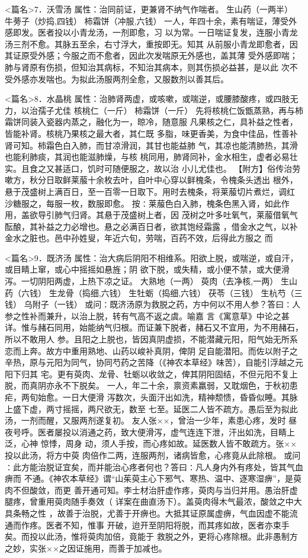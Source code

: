 \documentclass[a4paper,12pt,UTF8,twoside]{ctexbook}
\begin{document}
<篇名>7．沃雪汤
属性：治同前证，更兼肾不纳气作喘者。 
生山药（一两半） 牛蒡子（炒捣,四钱） 柿霜饼（冲服,六钱） 
一人，年四十余，素有喘证，薄受外感即发。医者投以小青龙汤，一剂即愈，习 
以为常。一日喘证复发，连服小青龙汤三剂不愈。其脉五至余，右寸浮大，重按即无。知其 
从前服小青龙即愈者，因其证原受外感；今服之而不愈者，因此次发喘原无外感也，盖其薄 
受外感即喘；肺与肾原有伤损，但知治其病标，不知治其病本，则其伤损必益甚，是以此 
次不受外感亦发喘也。为拟此汤服两剂全愈，又服数剂以善其后。 

<篇名>8．水晶桃
属性：治肺肾两虚，或咳嗽，或喘逆，或腰膝酸疼，或四肢无力，以治孺子尤佳 
核桃仁（一斤） 柿霜饼（一斤） 
先将核桃仁饭甑蒸熟，再与柿霜饼同装入瓷器内蒸之，融化为一，晾冷，随意服 
凡果核之仁，具补益之性者，皆能补肾。核桃乃果核之最大者，其仁既 
多脂，味更香美，为食中佳品，性善补肾可知。柿霜色白入肺，而甘凉滑润，其甘也能益肺 
气，其凉也能清肺热，其滑也能利肺痰，其润也能滋肺燥，与核 
桃同用，肺肾同补，金水相生，虚者必易壮实。且食之又甚适口，饥时可随便服之，故以治 
小儿尤佳也。 
【附方】俗传治劳嗽方，秋分日取鲜莱菔十余枚去叶，自叶中心穿以鲜槐条，令槐条头透出 
根外，悬于茂盛树上满百日，至一百零一日取下。用时去槐条，将莱菔切片煮烂，调红 
沙糖服之，每服一枚，数服即愈。 
按∶莱菔色白入肺，槐条色黑入肾，如此作用，盖欲导引肺气归肾。其悬于茂盛树上者，因 
茂树之叶多吐氧气，莱菔借氧气酝酿，其补益之力必增也。悬之必满百日者，欲其饱经霜露 
，借金水之气，以补金水之脏也。邑中孙姓叟，年近六旬，劳喘，百药不效，后得此方服之 
而 

<篇名>9．既济汤
属性：治大病后阴阳不相维系。阳欲上脱，或喘逆，或自汗，或目睛上窜，或心中摇摇如悬旌；阴 
欲下脱，或失精，或小便不禁，或大便滑泻。一切阴阳两虚，上热下凉之证。 
大熟地（一两） 萸肉（去净核,一两） 生山药（六钱） 生龙骨（捣细,六钱） 
生牡蛎（捣细,六钱） 茯苓（三钱） 生杭芍（三钱） 乌附子（一钱） 
或问∶既济汤原为救脱之药，方中何以不用人参？答曰∶人参之性补而兼升，以治上脱，转有气高不返之虞。喻嘉 
言《寓意草》中论之甚详。惟与赭石同用，始能纳气归根。而证兼下脱者，赭石又不宜用，为不用赭石，所以不敢用人 
参。且阳之上脱也，皆因真阴虚损，不能潜藏元阳，阳气始无所系恋而上奔。故方中重用熟地、山药以峻补真阴，俾阴 
足自能潜阳。而佐以附子之辛热，原与元阳为同气，协同芍药之苦降（《神农本草经》味苦），自能引浮越之元阳下归其 
宅。更有萸肉、龙骨、牡蛎以收敛之，俾其阴阳固结，不但元阳不复上脱，而真阴亦永不下脱矣。 
一人，年二十余，禀资素羸弱，又耽烟色，于秋初患疟，两旬始愈。一日大便滑 
泻数次，头面汗出如洗，精神颓愦，昏昏似睡。其脉上盛下虚，两寸摇摇，两尺欲无，数至 
七至。延医二人皆不疏方。愚后至为拟此汤，一剂而醒，又服两剂遂复初。 
友人张××，曾治一少年，素患心疼，发时 
昼夜号呼。医者屡投以消通之药，致大便滑泻，虚气连连下泄，汗出如洗，目睛上泛，心神 
惊悸，周身 动，须人手按，而心疼如故。延医数人皆不敢疏方。张××投以此汤，将方中萸 
肉倍作二两，连服两剂，诸病皆愈，心疼竟从此除根。 
或问∶此方能治脱证宜矣，而并能治心疼者何也？答曰∶凡人身内外有疼处，皆其气血痹而 
不通。《神农本草经》谓“山茱萸主心下邪气、寒热、温中、逐寒湿痹”，是萸肉不但酸敛，而更 
善开通可知。李士材治肝虚作疼，萸肉与当归并用。愚治肝虚腿疼，曾重用萸肉随手奏效（ 
详案在曲直汤下）。盖萸肉得木气最浓，酸敛之中大具条畅之性 
，故善于治脱，尤善于开痹也。大抵其证原属虚痹，气血因虚不能流通而作疼。医者不知，惟事 
开破，迨开至阴阳将脱，而其疼如故，医者亦束手矣。而投以此汤，惟将萸肉加倍，竟能于 
救脱之外，更将心疼除根。此非愚制方之妙，实张××之因证施用，而善于加减也。 
\end{document}
